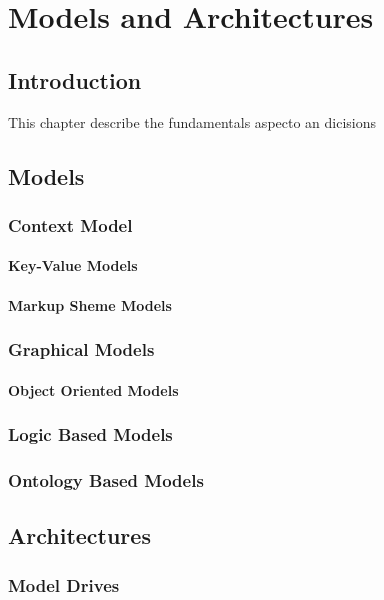 \chapter{Models and Architectures}

\section{Introduction}

This chapter describe the fundamentals aspecto an dicisions 

\section{Models}
\subsection{Context Model}
\subsubsection{Key-Value Models}
\subsubsection{Markup Sheme Models}
\subsection{Graphical Models}
\subsubsection{Object Oriented Models}
\subsection{Logic Based Models}
\subsection{Ontology Based Models}


\section{Architectures}
\subsection{Model Drives}
